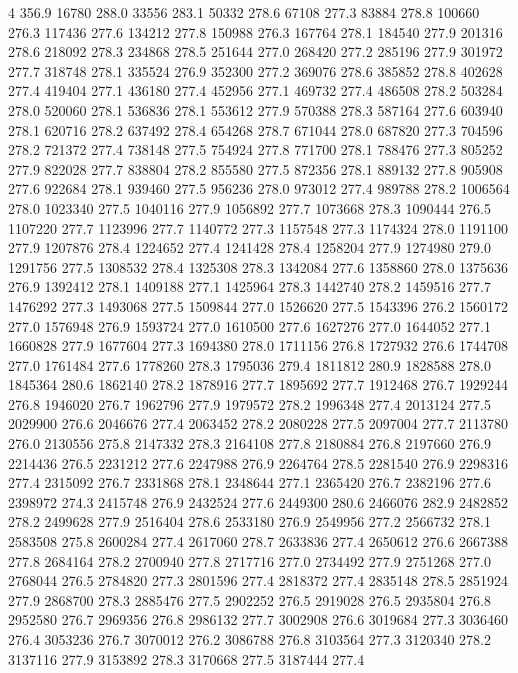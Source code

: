 4 356.9
16780 288.0
33556 283.1
50332 278.6
67108 277.3
83884 278.8
100660 276.3
117436 277.6
134212 277.8
150988 276.3
167764 278.1
184540 277.9
201316 278.6
218092 278.3
234868 278.5
251644 277.0
268420 277.2
285196 277.9
301972 277.7
318748 278.1
335524 276.9
352300 277.2
369076 278.6
385852 278.8
402628 277.4
419404 277.1
436180 277.4
452956 277.1
469732 277.4
486508 278.2
503284 278.0
520060 278.1
536836 278.1
553612 277.9
570388 278.3
587164 277.6
603940 278.1
620716 278.2
637492 278.4
654268 278.7
671044 278.0
687820 277.3
704596 278.2
721372 277.4
738148 277.5
754924 277.8
771700 278.1
788476 277.3
805252 277.9
822028 277.7
838804 278.2
855580 277.5
872356 278.1
889132 277.8
905908 277.6
922684 278.1
939460 277.5
956236 278.0
973012 277.4
989788 278.2
1006564 278.0
1023340 277.5
1040116 277.9
1056892 277.7
1073668 278.3
1090444 276.5
1107220 277.7
1123996 277.7
1140772 277.3
1157548 277.3
1174324 278.0
1191100 277.9
1207876 278.4
1224652 277.4
1241428 278.4
1258204 277.9
1274980 279.0
1291756 277.5
1308532 278.4
1325308 278.3
1342084 277.6
1358860 278.0
1375636 276.9
1392412 278.1
1409188 277.1
1425964 278.3
1442740 278.2
1459516 277.7
1476292 277.3
1493068 277.5
1509844 277.0
1526620 277.5
1543396 276.2
1560172 277.0
1576948 276.9
1593724 277.0
1610500 277.6
1627276 277.0
1644052 277.1
1660828 277.9
1677604 277.3
1694380 278.0
1711156 276.8
1727932 276.6
1744708 277.0
1761484 277.6
1778260 278.3
1795036 279.4
1811812 280.9
1828588 278.0
1845364 280.6
1862140 278.2
1878916 277.7
1895692 277.7
1912468 276.7
1929244 276.8
1946020 276.7
1962796 277.9
1979572 278.2
1996348 277.4
2013124 277.5
2029900 276.6
2046676 277.4
2063452 278.2
2080228 277.5
2097004 277.7
2113780 276.0
2130556 275.8
2147332 278.3
2164108 277.8
2180884 276.8
2197660 276.9
2214436 276.5
2231212 277.6
2247988 276.9
2264764 278.5
2281540 276.9
2298316 277.4
2315092 276.7
2331868 278.1
2348644 277.1
2365420 276.7
2382196 277.6
2398972 274.3
2415748 276.9
2432524 277.6
2449300 280.6
2466076 282.9
2482852 278.2
2499628 277.9
2516404 278.6
2533180 276.9
2549956 277.2
2566732 278.1
2583508 275.8
2600284 277.4
2617060 278.7
2633836 277.4
2650612 276.6
2667388 277.8
2684164 278.2
2700940 277.8
2717716 277.0
2734492 277.9
2751268 277.0
2768044 276.5
2784820 277.3
2801596 277.4
2818372 277.4
2835148 278.5
2851924 277.9
2868700 278.3
2885476 277.5
2902252 276.5
2919028 276.5
2935804 276.8
2952580 276.7
2969356 276.8
2986132 277.7
3002908 276.6
3019684 277.3
3036460 276.4
3053236 276.7
3070012 276.2
3086788 276.8
3103564 277.3
3120340 278.2
3137116 277.9
3153892 278.3
3170668 277.5
3187444 277.4
